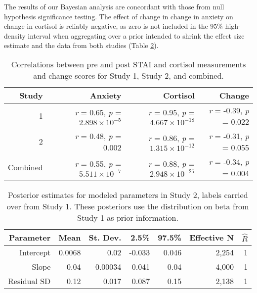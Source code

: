 \documentclass[review]{elsarticle}\usepackage[]{graphicx}\usepackage[]{color}
\begin{document}
The results of our Bayesian analysis are concordant with those from null hypothesis significance testing.
The effect of change in change in anxiety on change in cortisol is reliably negative, as zero is not included in the 95\% high-density interval when aggregating over a prior intended to shrink the effect size estimate and the data from both studies (Table \ref{tab:bayes2}).

\begin{table}[ht]
\centering
\caption{Correlations between pre and post STAI and cortisol measurements and change scores for Study 1, Study 2, and combined.}
\begin{tabular}{rrrrr}
\hline
 Study & & Anxiety & Cortisol & Change \\ [0.5ex]
 \hline
  1 & & \textit{r} = 0.65, \textit{p} = $2.898 \times 10^{-5}$ & \textit{r} = 0.95, \textit{p} = $4.667 \times 10^{-18}$ & \textit{r} = -0.39, \textit{p} = 0.022 \\
  2 & & \textit{r} = 0.48, \textit{p} = 0.002 & \textit{r} = 0.86, \textit{p} = $1.315 \times 10^{-12}$ & \textit{r} = -0.31, \textit{p} = 0.055 \\ [0.5ex]
 \hline
  Combined & & \textit{r} = 0.55, \textit{p} = $5.511 \times 10^{-7}$ & \textit{r} = 0.88, \textit{p} = $2.948 \times 10^{-25}$ & \textit{r} = -0.34, \textit{p} = 0.004 \\
 [1ex]
 \hline
\end{tabular}
\label{tab:effectsize}
\end{table}

\begin{table}[ht]
\centering
  \caption{Posterior estimates for modeled parameters in Study 2, labels carried over from Study 1. These posteriors use the distribution on beta from Study 1 as prior information.}
  \begin{tabular}{rrrrrrr}
  \hline
  Parameter & Mean & St. Dev. & 2.5\% & 97.5\% & Effective N & $\hat{R}$ \\
  \hline
Intercept & 0.0068 & 0.02 & -0.033 & 0.046 & 2,254 &   1 \\ 
  Slope & -0.04 & 0.00034 & -0.041 & -0.04 & 4,000 &   1 \\ 
  Residual SD & 0.12 & 0.017 & 0.087 & 0.15 & 2,138 &   1 \\ 
   \hline

  \end{tabular}
  \label{tab:bayes2}
\end{table}
\end{document}
